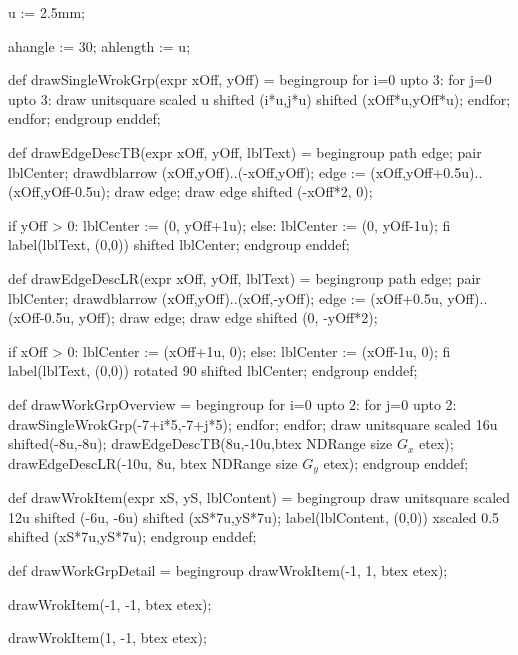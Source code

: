 u := 2.5mm;

ahangle := 30;
ahlength := u;

def drawSingleWrokGrp(expr xOff, yOff) =
begingroup
for i=0 upto 3:
	for j=0 upto 3:
		draw unitsquare scaled u shifted (i*u,j*u) shifted (xOff*u,yOff*u);
	endfor;
endfor;
endgroup
enddef;

def drawEdgeDescTB(expr xOff, yOff, lblText) =
begingroup
path edge;
pair lblCenter;
drawdblarrow (xOff,yOff)..(-xOff,yOff);
edge := (xOff,yOff+0.5u)..(xOff,yOff-0.5u);
draw edge;
draw edge shifted (-xOff*2, 0);

if yOff > 0:
lblCenter := (0, yOff+1u);
else:
lblCenter := (0, yOff-1u);
fi
label(lblText, (0,0)) shifted lblCenter;
endgroup
enddef;

def drawEdgeDescLR(expr xOff, yOff, lblText) =
begingroup
path edge;
pair lblCenter;
drawdblarrow (xOff,yOff)..(xOff,-yOff);
edge := (xOff+0.5u, yOff)..(xOff-0.5u, yOff);
draw edge;
draw edge shifted (0, -yOff*2);

if xOff > 0:
lblCenter := (xOff+1u, 0);
else:
lblCenter := (xOff-1u, 0);
fi
label(lblText, (0,0)) rotated 90 shifted lblCenter;
endgroup
enddef;

def drawWorkGrpOverview =
begingroup
for i=0 upto 2:
	for j=0 upto 2:
		drawSingleWrokGrp(-7+i*5,-7+j*5);
	endfor;
endfor;
draw unitsquare scaled 16u shifted(-8u,-8u);
drawEdgeDescTB(8u,-10u,btex NDRange size $G_x$ etex);
drawEdgeDescLR(-10u, 8u, btex NDRange size $G_y$ etex);
endgroup
enddef;

def drawWrokItem(expr xS, yS, lblContent) =
begingroup
draw unitsquare scaled 12u shifted (-6u, -6u) shifted (xS*7u,yS*7u);
label(lblContent, (0,0)) xscaled 0.5 shifted (xS*7u,yS*7u);
endgroup
enddef;

def drawWorkGrpDetail =
begingroup
drawWrokItem(-1, 1, btex  etex);

drawWrokItem(-1, -1, btex  etex);

drawWrokItem(1, -1, btex  etex);

